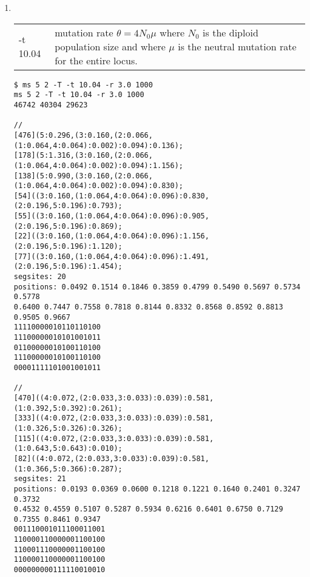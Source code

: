 \begin{enumerate}
\begin{verbatim}
[76]((1:0.065,4:0.065):1.335,(5:0.494,(2:0.316,3:0.316):0.178):0.906);
[17]((1:0.117,4:0.117):1.283,(5:0.494,(2:0.316,3:0.316):0.178):0.906);
[140]((1:0.117,4:0.117):1.161,(5:0.494,(2:0.316,3:0.316):0.178):0.784);
[163]((1:0.117,4:0.117):1.161,(5:0.494,(2:0.016,3:0.016):0.478):0.784);
[70]((1:0.117,4:0.117):1.161,(5:0.494,(2:0.016,3:0.016):0.478):0.784);
[385]((1:0.117,4:0.117):1.161,(5:0.494,(2:0.016,3:0.016):0.478):0.784);
[40]((1:0.117,4:0.117):1.669,(5:0.494,(2:0.016,3:0.016):0.478):1.292);
[109]((1:0.117,4:0.117):0.669,(5:0.494,(2:0.016,3:0.016):0.478):0.292);
\end{verbatim}


\item ~\\
\begin{tabular}{lp{11cm}}
-t 10.04 & mutation rate $\theta=4N_0\mu$ where $N_0$ is the diploid population size and where $\mu$ is the neutral
mutation rate for the entire locus. 

\end{tabular}
\begin{verbatim}
$ ms 5 2 -T -t 10.04 -r 3.0 1000
ms 5 2 -T -t 10.04 -r 3.0 1000 
46742 40304 29623

//
[476](5:0.296,(3:0.160,(2:0.066,(1:0.064,4:0.064):0.002):0.094):0.136);
[178](5:1.316,(3:0.160,(2:0.066,(1:0.064,4:0.064):0.002):0.094):1.156);
[138](5:0.990,(3:0.160,(2:0.066,(1:0.064,4:0.064):0.002):0.094):0.830);
[54]((3:0.160,(1:0.064,4:0.064):0.096):0.830,(2:0.196,5:0.196):0.793);
[55]((3:0.160,(1:0.064,4:0.064):0.096):0.905,(2:0.196,5:0.196):0.869);
[22]((3:0.160,(1:0.064,4:0.064):0.096):1.156,(2:0.196,5:0.196):1.120);
[77]((3:0.160,(1:0.064,4:0.064):0.096):1.491,(2:0.196,5:0.196):1.454);
segsites: 20
positions: 0.0492 0.1514 0.1846 0.3859 0.4799 0.5490 0.5697 0.5734 0.5778 
0.6400 0.7447 0.7558 0.7818 0.8144 0.8332 0.8568 0.8592 0.8813 0.9505 0.9667 
11110000010110110100
11100000010101001011
01100000010100110100
11100000010100110100
00001111101001001011

//
[470]((4:0.072,(2:0.033,3:0.033):0.039):0.581,(1:0.392,5:0.392):0.261);
[333]((4:0.072,(2:0.033,3:0.033):0.039):0.581,(1:0.326,5:0.326):0.326);
[115]((4:0.072,(2:0.033,3:0.033):0.039):0.581,(1:0.643,5:0.643):0.010);
[82]((4:0.072,(2:0.033,3:0.033):0.039):0.581,(1:0.366,5:0.366):0.287);
segsites: 21
positions: 0.0193 0.0369 0.0600 0.1218 0.1221 0.1640 0.2401 0.3247 0.3732 
0.4532 0.4559 0.5107 0.5287 0.5934 0.6216 0.6401 0.6750 0.7129 0.7355 0.8461 0.9347 
001110001011100011001
110000110000001100100
110001110000001100100
110000110000001100100
000000000111110010010
\end{verbatim}
\end{enumerate}






